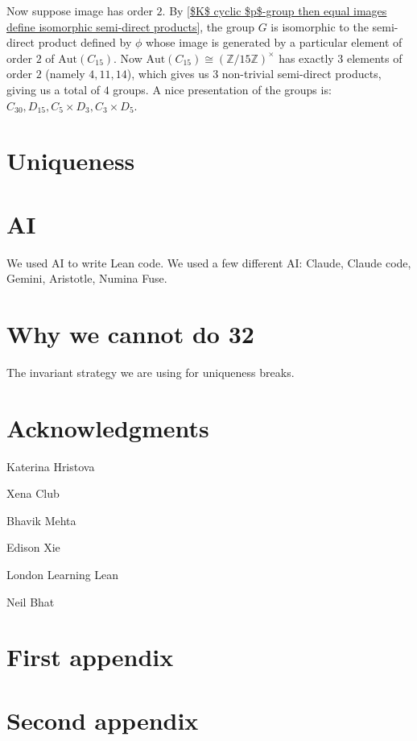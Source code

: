 \documentclass[a4paper,11pt, titlepage]{article}
\theoremstyle{remark}
\begin{document}
Now suppose image has order $2$. By \ref{$K$ cyclic $p$-group then equal images define isomorphic semi-direct products}, the group $G$ is isomorphic to the semi-direct product defined by $\phi$ whose image is generated by a particular element of order $2$ of $\text{Aut}(C_{15})$. Now $\text{Aut}(C_{15}) \cong (\mathbb{Z}/15\mathbb{Z})^\times$ has exactly $3$ elements of order $2$ (namely $4, 11, 14$), which gives us $3$ non-trivial semi-direct products, giving us a total of $4$ groups. A nice presentation of the groups is: $C_{30}, D_{15}, C_5 \times D_3, C_3 \times D_5$.

\section{Uniqueness}

\section{AI}
We used AI to write Lean code.
We used a few different AI: Claude, Claude code, Gemini, Aristotle, Numina Fuse.

\section{Why we cannot do 32}
The invariant strategy we are using for uniqueness breaks.


\section*{Acknowledgments}
Katerina Hristova

Xena Club

Bhavik Mehta

Edison Xie

London Learning Lean

Neil Bhat

\appendix

\section{First appendix}
\label{sec:appendix1}

\section{Second appendix}
\label{sec:appendix2}



\end{document}
